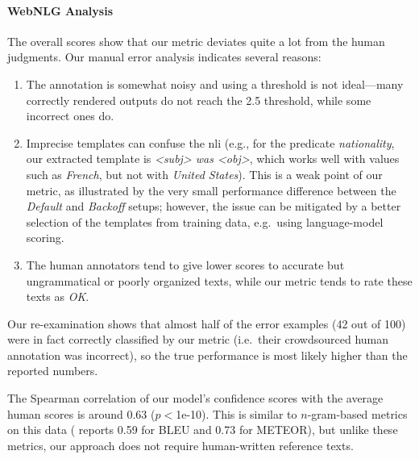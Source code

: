 \paragraph{WebNLG Analysis} The overall scores show that our metric deviates quite a lot from the human judgments. Our manual error analysis indicates several reasons:
\begin{enumerate}
    \item The annotation is somewhat noisy and using a threshold is not ideal---many correctly rendered outputs do not reach the 2.5 threshold, while some incorrect ones do.
    \item Imprecise templates can confuse the \ac{nli} (e.g., for the predicate \emph{nationality}, our extracted template is \emph{\textless{}subj\textgreater{} was \textless{}obj\textgreater{}}, which works well with values such as \emph{French}, but not with \emph{United States}). This is a weak point of our metric, as illustrated by the very small performance difference between the \emph{Default} and \emph{Backoff} setups; however, the issue can be mitigated by a better selection of the templates from training data, e.g.\ using language-model scoring.
    \item The human annotators tend to give lower scores to accurate but ungrammatical or poorly organized texts, while our metric tends to rate these texts as \emph{OK}.
\end{enumerate}

Our re-examination shows that almost half of the error examples (42 out of 100) were in fact correctly classified by our metric (i.e.\ their crowdsourced human annotation was incorrect),  so the true performance is most likely higher than the reported numbers.

The Spearman correlation of our model's confidence scores with the average human scores is around 0.63 ($p<$1e-10). This is similar to $n$-gram-based metrics on this data (\citealp{shimorinaWebNLGChallengeHuman2019} reports 0.59 for BLEU and 0.73 for METEOR), but unlike these metrics, our approach does not require human-written reference texts.

%


